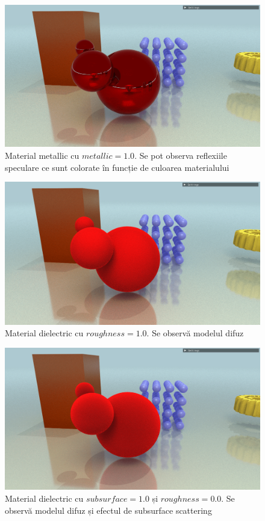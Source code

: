 \documentclass[12pt,a4paper]{report}
\numberwithin{equation}{section} %
\begin{document}
\begin{figure}[!htb]
	\centering
	\includegraphics[width=\textwidth]{pics/demo-metallic-1.0.png}
	\caption{Material metallic cu $metallic = 1.0$. Se pot observa reflexiile speculare
		ce sunt colorate în funcție de culoarea materialului}
	\label{fig:demo-metallic-1.0}
\end{figure}
\begin{figure}[!htb]
	\centering
	\includegraphics[width=\textwidth]{pics/demo-rough-1.0.png}
	\caption{Material dielectric cu $roughness = 1.0$. Se observă modelul difuz}
	\label{fig:demo-rough-1.0}
\end{figure}
\begin{figure}[!htb]
	\centering
	\includegraphics[width=\textwidth]{pics/demo-subsurface-1.0.png}
	\caption{Material dielectric cu $subsurface = 1.0$ și $roughness = 0.0$. Se observă modelul difuz și efectul de subsurface scattering}
	\label{fig:demo-subsurface-1.0}
\end{figure}
\end{document}

